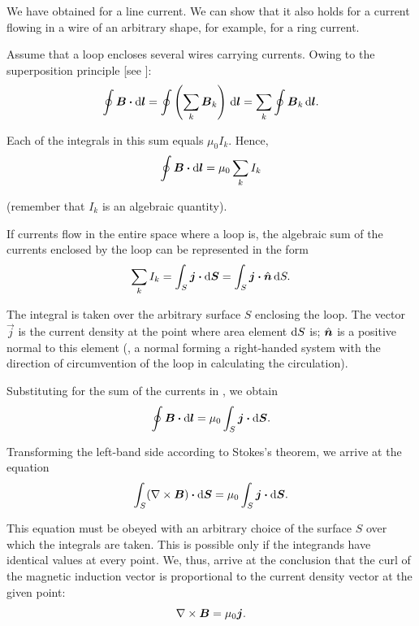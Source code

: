 We have obtained  for a line current. We can show that it also holds for a current flowing in a wire of an arbitrary shape, for example, for a ring current.

Assume that a loop encloses several wires carrying currents. Owing to the superposition principle [see ]:
\begin{equation*}
    \oint \boldsymbol{B}\boldsymbol{\cdot} \mathrm{d}\boldsymbol{l} = \oint \left( \sum_k \boldsymbol{B}_k \right)\, \mathrm{d}\boldsymbol{l} = \sum_k \oint \boldsymbol{B}_k\, \mathrm{d}\boldsymbol{l}.
\end{equation*}

\noindent
Each of the integrals in this sum equals $\mu_0I_k$. Hence,
\begin{equation}\label{eq:6_101}
    \oint \boldsymbol{B}\boldsymbol{\cdot} \mathrm{d}\boldsymbol{l} = \mu_0 \sum_k I_k
\end{equation}

\noindent
(remember that $I_k$ is an algebraic quantity).

If currents flow in the entire space where a loop is, the algebraic sum of the currents enclosed by the loop can be represented in the form
\begin{equation}\label{eq:6_102}
    \sum_k I_k = \int_S \boldsymbol{j}\boldsymbol{\cdot} \mathrm{d}\boldsymbol{S} = \int_S \boldsymbol{j}\boldsymbol{\cdot} \hat{\boldsymbol{n}}\, \mathrm{d} S.
\end{equation}

\noindent
The integral is taken over the arbitrary surface $S$ enclosing the loop. The vector $\vec{j}$ is the current density at the point where area element $\mathrm{d} S$ is; $\hat{\boldsymbol{n}}$ is a positive normal to this element (\ie, a normal forming a right-handed system with the direction of circumvention
of the loop in calculating the circulation).

Substituting  for the sum of the currents in , we obtain
\begin{equation*}
    \oint \boldsymbol{B}\boldsymbol{\cdot} \mathrm{d}\boldsymbol{l} = \mu_0 \int_S \boldsymbol{j}\boldsymbol{\cdot} \mathrm{d}\boldsymbol{S}.
\end{equation*}

Transforming the left-band side according to Stokes's theorem, we arrive at the equation
\begin{equation*}
    \int_S (\nabla\times\boldsymbol{B}) \boldsymbol{\cdot} \mathrm{d}\boldsymbol{S} = \mu_0 \int_S \boldsymbol{j}\boldsymbol{\cdot} \mathrm{d}\boldsymbol{S}.
\end{equation*}

\noindent
This equation must be obeyed with an arbitrary choice of the surface $S$ over which the integrals are taken. This is possible only if the integrands have identical values at every point. We, thus, arrive at the conclusion that the curl of the magnetic induction vector is proportional to the current density vector at the given point:
\begin{equation}\label{eq:6_103}
    \nabla\times\boldsymbol{B} = \mu_0 \boldsymbol{j}.
\end{equation}

